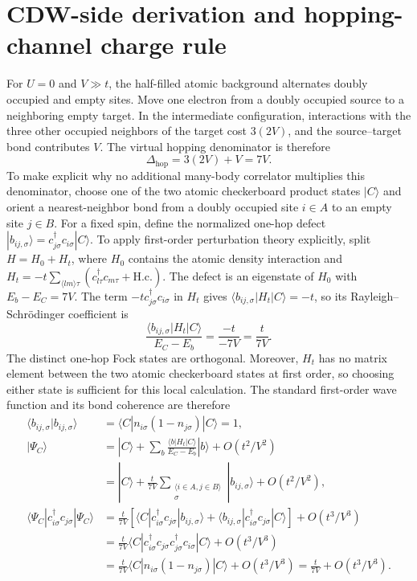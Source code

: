 \documentclass[10pt]{article}
\begin{document}
\section{CDW-side derivation and hopping-channel charge rule}
For $U=0$ and $V\gg t$, the half-filled atomic background alternates doubly occupied and empty sites. Move one electron from a doubly occupied source to a neighboring empty target. In the intermediate configuration, interactions with the three other occupied neighbors of the target cost $3(2V)$, and the source--target bond contributes $V$. The virtual hopping denominator is therefore
\begin{equation}
\Delta_{\mathrm{hop}}=3(2V)+V=7V.
\label{eq:s-seven-v}
\end{equation}
To make explicit why no additional many-body correlator multiplies this
denominator, choose one of the two atomic checkerboard product states
$|C\rangle$ and orient a nearest-neighbor bond from a doubly occupied site
$i\in A$ to an empty site $j\in B$. For a fixed spin, define the normalized
one-hop defect $|b_{ij,\sigma}\rangle=c^\dagger_{j\sigma}c_{i\sigma}|C\rangle$.
To apply first-order perturbation theory explicitly, split
$H=H_0+H_t$, where $H_0$ contains the atomic density interaction and
$H_t=-t\sum_{\langle lm\rangle\tau}
(c^\dagger_{l\tau}c_{m\tau}+\mathrm{H.c.})$.  The defect is an eigenstate of
$H_0$ with $E_b-E_C=7V$.  The term
$-t c^\dagger_{j\sigma}c_{i\sigma}$ in $H_t$ gives
$\langle b_{ij,\sigma}|H_t|C\rangle=-t$, so its Rayleigh--Schr\"odinger
coefficient is
\[
 \frac{\langle b_{ij,\sigma}|H_t|C\rangle}{E_C-E_b}
 =\frac{-t}{-7V}=\frac{t}{7V}.
\]
The distinct one-hop Fock states are orthogonal.  Moreover, $H_t$ has no
matrix element between the two atomic checkerboard states at first order,
so choosing either state is sufficient for this local calculation.  The
standard first-order wave function and its bond coherence are therefore
\begin{align}
\langle b_{ij,\sigma}|b_{ij,\sigma}\rangle
 &=\langle C|n_{i\sigma}(1-n_{j\sigma})|C\rangle=1,
 \nonumber\\
|\Psi_C\rangle
 &=|C\rangle+
 \sum_{b}\frac{\langle b|H_t|C\rangle}{E_C-E_b}|b\rangle
 +O(t^2/V^2)\nonumber\\
 &=|C\rangle+\frac{t}{7V}
 \sum_{\substack{\langle i\in A,j\in B\rangle\\ \sigma}}
 |b_{ij,\sigma}\rangle+O(t^2/V^2),
 \nonumber\\
\langle\Psi_C|c^\dagger_{i\sigma}c_{j\sigma}|\Psi_C\rangle
 &=\frac{t}{7V}\left[
 \langle C|c^\dagger_{i\sigma}c_{j\sigma}|b_{ij,\sigma}\rangle
 +\langle b_{ij,\sigma}|c^\dagger_{i\sigma}c_{j\sigma}|C\rangle
 \right]+O(t^3/V^3)\nonumber\\
 &=\frac{t}{7V}
 \langle C|c^\dagger_{i\sigma}c_{j\sigma}
 c^\dagger_{j\sigma}c_{i\sigma}|C\rangle+O(t^3/V^3)
 \nonumber\\
 &=\frac{t}{7V}
 \langle C|n_{i\sigma}(1-n_{j\sigma})|C\rangle+O(t^3/V^3)
 =\frac{t}{7V}+O(t^3/V^3).
\label{eq:s-density-matrix-v}
\end{align}
\end{document}
